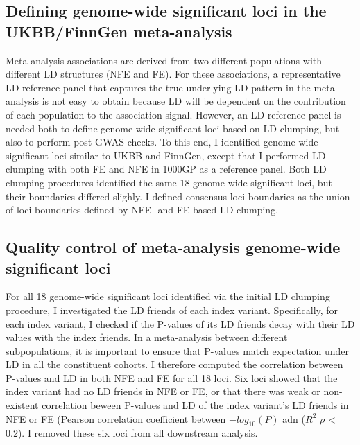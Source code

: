 \subsection{Defining genome-wide significant loci in the UKBB/FinnGen meta-analysis}
Meta-analysis associations are derived from two different populations with different LD structures (NFE and FE). 
For these associations, a  representative LD reference panel that captures the true underlying LD pattern in the meta-analysis is not easy to obtain because LD will be dependent on the contribution of each population to the association signal. However, an LD reference panel is needed both to define genome-wide significant loci based on LD clumping, but also to perform post-GWAS checks. To this end, I identified genome-wide significant loci similar to UKBB and FinnGen, except that I performed LD clumping with both FE and NFE in 1000GP as a reference panel. Both LD clumping procedures identified the same 18 genome-wide significant loci, but their boundaries differed slighly. I defined consensus loci boundaries as the union of loci boundaries defined by NFE- and FE-based LD clumping. \\

\subsection{Quality control of meta-analysis genome-wide significant loci}
For all 18 genome-wide significant loci identified via the initial LD clumping procedure, I investigated the LD friends of each index variant. Specifically, for each index variant, I checked if the P-values of its LD friends decay with their LD values with the index friends. In a meta-analysis between different subpopulations, it is important to ensure that P-values match expectation under LD  in all the constituent cohorts. I therefore computed the correlation between P-values and LD in both NFE and FE for all 18 loci. Six loci showed that the index variant had no LD friends in NFE or FE, or that there was weak or non-existent correlation beween P-values and LD of the index variant's LD friends in NFE or FE (Pearson correlation coefficient between $-log_{10}(P)$ adn ($R^{2}$ $\rho$ < 0.2). I removed these six loci from all downstream analysis.










